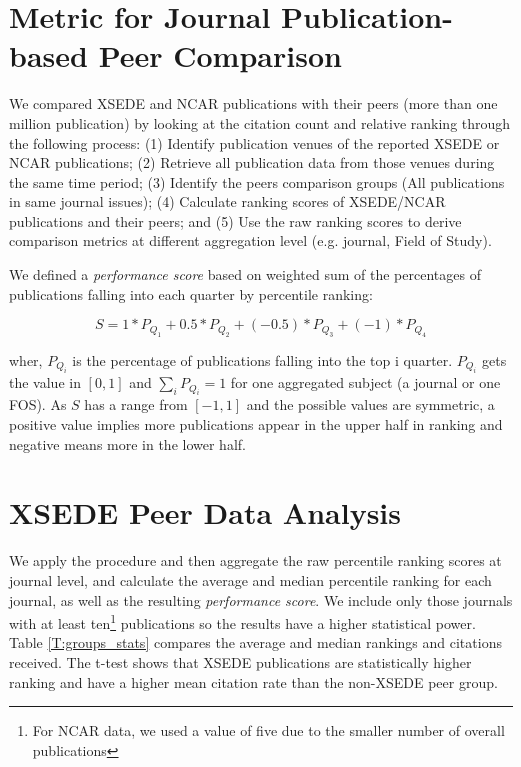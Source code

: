 \documentclass[10pt, conference, compsocconf]{IEEEtran}
\begin{document}
\section{Metric for Journal Publication-based Peer Comparison} \label{S:metric}

We compared XSEDE and NCAR publications with their peers (more than one million publication) by looking at the citation count and relative ranking through the following process: 
(1) Identify publication venues of the reported XSEDE or NCAR publications;
(2) Retrieve all publication data from those venues during the same time period;
(3) Identify the peers comparison groups (All publications in same journal issues);
(4) Calculate ranking scores of XSEDE/NCAR publications and their peers; and
(5) Use the raw ranking scores to derive comparison metrics at different aggregation level (e.g. journal, Field of Study).

We defined a \emph{performance score} based on weighted sum of the percentages of publications falling into each quarter by percentile ranking:

\[	S = 1*P_{Q_1} + 0.5*P_{Q_2}+ (-0.5)*P_{Q_3} + (-1)*P_{Q_4} \]

wher, $P_{Q_i}$ is the percentage of publications falling into the top i quarter. $P_{Q_i}$ gets the value in $[0,1]$ and $\sum_{i} {P_{Q_i}} = 1$ for one aggregated subject (a journal or one FOS). As $S$ has a range from $[-1, 1]$ and the possible values are symmetric, a positive value implies more publications appear in the upper half in ranking and negative means more in the lower half.

\section{XSEDE Peer Data Analysis}
\label{S:xsede}

We apply the procedure and then aggregate the raw percentile ranking scores at journal level, and calculate the average and median percentile ranking for each journal, as well as the resulting \emph{performance score}. We include only those journals with at least ten\footnote{For NCAR data, we used a value of five due to the smaller number of overall publications} publications so the results have a higher statistical power. Table \ref{T:groups_stats} compares the average and median rankings and citations received. The t-test shows that XSEDE publications are statistically higher ranking and have a higher  mean citation rate than the non-XSEDE peer group.
\end{document}
